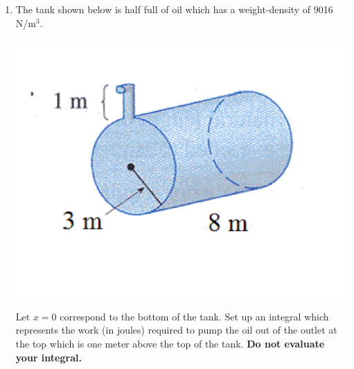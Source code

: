 \documentclass[12pt]{article}
\newif\ifans
\begin{document}
\begin{enumerate}
\ifans{\fbox{1,456 ft$\cdot$lb}} \fi

\newpage

\item The tank shown below is half full of oil which has a weight-density of 9016 N/m$^3$.  
\begin{center}
\includegraphics[scale=0.3]{tank.pdf}
\end{center}
Let $x=0$ correspond to the bottom of the tank.  Set up an integral which represents the work (in joules) required to pump the oil out of the outlet at the top which is one meter above the top of the tank.  {\bf Do not evaluate your integral.}

\ifans{\fbox{$W=\int_0^3 9016 \cdot 8 \cdot 2 \cdot \sqrt{9-(3-x)^2} \cdot (7-x) \,dx= 144,256 \int_0^3 (7-x)\sqrt{6x-x^2}\,dx$ J}} \fi

\end{enumerate}
\end{document}
